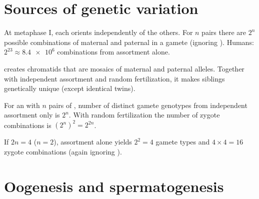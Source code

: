\section{Sources of genetic variation}

\begin{proposition}\label{prop:g11:meiosis-life-cycles:assortment}
At metaphase I, each  orients independently of the others. For $n$
 pairs there are $2^{n}$ possible combinations of maternal and
paternal  in a gamete (ignoring ). Humans:
$2^{23} \approx \num{8.4e6}$ combinations from assortment alone.
\end{proposition}
\admitted

\begin{proposition}\label{prop:g11:meiosis-life-cycles:co-var}
 creates chromatids that are mosaics of maternal and paternal
alleles. Together with independent assortment and random fertilization, it makes
siblings genetically unique (except identical twins).
\end{proposition}
\admitted

\begin{method}\label{met:g11:meiosis-life-cycles:count}
For an  with $n$ pairs of , number of distinct gamete
genotypes from independent assortment only is $2^{n}$. With random fertilization
the number of zygote combinations is $(2^{n})^{2} = 2^{2n}$.
\end{method}

\begin{example}\label{ex:g11:meiosis-life-cycles:small}
If $2n = 4$ ($n = 2$), assortment alone yields $2^{2} = 4$ gamete types and
$4 \times 4 = 16$ zygote combinations (again ignoring ).
\end{example}

\section{Oogenesis and spermatogenesis}

